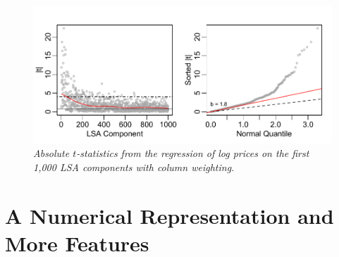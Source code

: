 \documentclass[12pt]{article}
\begin{document}
\begin{figure}
\caption{  \label{fig:lsatstats}  
  {\sl Absolute $t$-statistics from the regression of log prices on the first 1,000 LSA components with column weighting.}  }
  \centerline{ \includegraphics[width=5in]{figures/lsatstats.pdf} }
\end{figure}



 
\section{A Numerical Representation and More Features}
\label{sec:cca}
\end{document}
